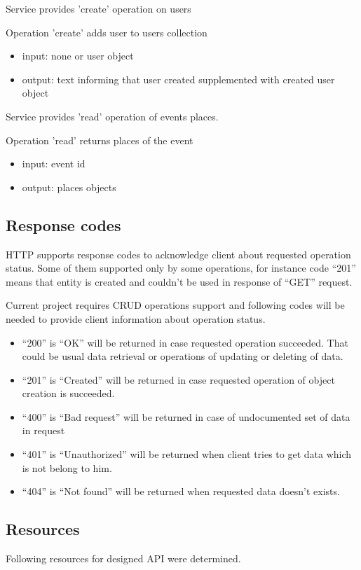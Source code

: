 \documentclass[thesis=M,english]{FITthesis}[2012/10/20]
\begin{document}
Service provides 'create' operation on users

Operation 'create' adds user to users collection
	\begin{itemize}
		\item input: none or user object
		\item output: text informing that user created supplemented with created user object
	\end{itemize}

Service provides 'read' operation of events places.

Operation 'read' returns places of the event
	\begin{itemize}
		\item input: event id
		\item output: places objects
	\end{itemize}


\subsection{Response codes}

HTTP supports response codes to acknowledge client about requested operation status. Some of them supported only by some operations, for instance code “201” means that entity is created and couldn't be used in response of “GET” request.

Current project requires CRUD operations support and following codes will be needed to provide client information about operation status. 
\begin{itemize}
	\item “200” is “OK” will be returned in case requested operation succeeded. That could be usual data retrieval or operations of updating or deleting of data.
	\item “201” is “Created” will be returned in case requested operation of object creation is succeeded. 
	\item “400” is “Bad request” will be returned in case of undocumented set of data in request
	\item “401” is “Unauthorized” will be returned when client tries to get data which is not belong to him.
	\item “404” is “Not found” will be returned when requested data doesn't exists.
\end{itemize}


\subsection{Resources}
Following resources for designed API were determined.
\end{document}
